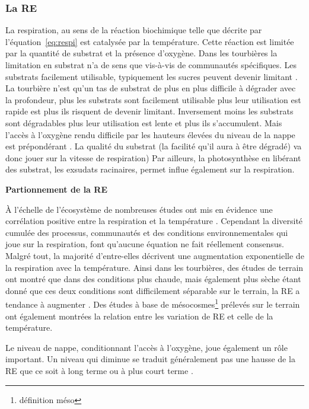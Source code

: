 \subsubsection{La RE}

La respiration, au sens de la réaction biochimique telle que  décrite par l'équation~\ref{eq:respi} est catalysée par la température.
Cette réaction est limitée par la quantité de substrat et la présence d'oxygène.
Dans les tourbières la limitation en substrat n'a de sens que vis-à-vis de communautés spécifiques.
Les substrats facilement utilisable, typiquement les sucres peuvent devenir limitant \plop.
La tourbière n'est qu'un tas de substrat de plus en plus difficile à dégrader avec la profondeur, plus les substrats sont facilement utilisable plus leur utilisation est rapide est plus ils risquent de devenir limitant.
Inversement moins les substrats sont dégradables plus leur utilisation est lente et plus ils s'accumulent.
Mais l'accès à l'oxygène rendu difficile par les hauteurs élevées du niveau de la nappe est prépondérant \plop.
La qualité du substrat (la facilité qu'il aura à être dégradé) va donc jouer sur la vitesse de respiration)
Par ailleurs, la photosynthèse en libérant des substrat, les exsudats racinaires, permet influe également sur la respiration.

\textbf{Partionnement de la RE}

À l'échelle de l'écosystème de nombreuses études ont mis en évidence une corrélation positive entre la respiration et la température \citep{singh1977,raich1992,luo2006}.
Cependant la diversité cumulée des processus, communautés et des conditions environnementales qui joue sur la respiration, font qu'aucune équation ne fait réellement consensus.
Malgré tout, la majorité d'entre-elles décrivent une augmentation exponentielle de la respiration avec la température.
Ainsi dans les tourbières, des études de terrain ont montré que dans des conditions plus chaude, mais également plus sèche étant donné que ces deux conditions sont difficilement séparable sur le terrain, la RE a tendance à augmenter  \citep{aurela2007,cai2010,ward2013}.
Des études à base de mésocosmes\footnote{définition méso} prélevés sur le terrain ont également montrées la relation entre les variation de RE et celle de la température\citep{updegraff2001,weedon2013}.

Le niveau de nappe, conditionnant l'accès à l'oxygène, joue également un rôle important.
Un niveau qui diminue se traduit généralement pas une hausse de la RE que ce soit à long terme \citep{strack2006,ballantyne2014} ou à plus court terme \citep{aerts1997}.

